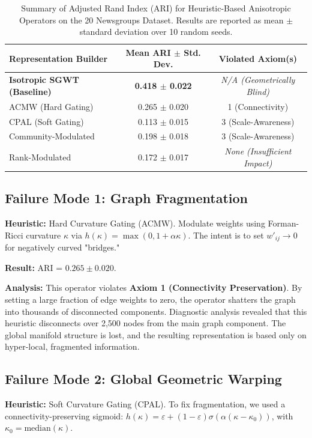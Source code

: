 \documentclass[11pt, letterpaper, twoside]{article}
\theoremstyle{definition}
\begin{document}
\begin{table}[h!]
    \centering
    \caption{Summary of Adjusted Rand Index (ARI) for Heuristic-Based Anisotropic Operators on the 20 Newsgroups Dataset. Results are reported as mean $\pm$ standard deviation over 10 random seeds.}
    \label{tab:results}
    \begin{tabular}{@{}lcc@{}}
        \toprule
        \textbf{Representation Builder} & \textbf{Mean ARI $\pm$ Std. Dev.} & \textbf{Violated Axiom(s)} \\ \midrule
        \textbf{Isotropic SGWT (Baseline)} & \textbf{0.418 $\pm$ 0.022} & \textit{N/A (Geometrically Blind)} \\ \midrule
        ACMW (Hard Gating) & 0.265 $\pm$ 0.020 & 1 (Connectivity) \\
        CPAL (Soft Gating) & 0.113 $\pm$ 0.015 & 3 (Scale-Awareness) \\
        Community-Modulated & 0.198 $\pm$ 0.018 & 3 (Scale-Awareness) \\
        Rank-Modulated & 0.172 $\pm$ 0.017 & \textit{None (Insufficient Impact)} \\ \bottomrule
    \end{tabular}
\end{table}

\subsection{Failure Mode 1: Graph Fragmentation}
\textbf{Heuristic:} Hard Curvature Gating (ACMW). Modulate weights using Forman-Ricci curvature $\kappa$ via $h(\kappa) = \max(0, 1 + \alpha \kappa)$. The intent is to set $w'_{ij} \to 0$ for negatively curved "bridges."

\noindent\textbf{Result:} ARI = $0.265 \pm 0.020$.

\noindent\textbf{Analysis:} This operator violates \textbf{Axiom 1 (Connectivity Preservation)}. By setting a large fraction of edge weights to zero, the operator shatters the graph into thousands of disconnected components. Diagnostic analysis revealed that this heuristic disconnects over 2,500 nodes from the main graph component. The global manifold structure is lost, and the resulting representation is based only on hyper-local, fragmented information.

\subsection{Failure Mode 2: Global Geometric Warping}
\textbf{Heuristic:} Soft Curvature Gating (CPAL). To fix fragmentation, we used a connectivity-preserving sigmoid: $h(\kappa) = \varepsilon + (1-\varepsilon)\sigma(\alpha(\kappa - \kappa_0))$, with $\kappa_0 = \text{median}(\kappa)$.
\end{document}
